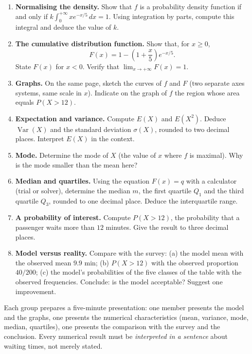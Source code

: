 \documentclass[11pt]{article}
\begin{document}
\begin{enumerate}
\item \textbf{Normalising the density.} Show that $f$ is a probability density function if and only if $\displaystyle k\int_0^{+\infty} x e^{-x/5}\,dx = 1$. Using integration by parts, compute this integral and deduce the value of $k$.
\item \textbf{The cumulative distribution function.} Show that, for $x \geq 0$,
\[
F(x) = 1 - \left(1 + \frac{x}{5}\right)e^{-x/5}.
\]
State $F(x)$ for $x<0$. Verify that $\lim_{x\to+\infty}F(x)=1$.
\item \textbf{Graphs.} On the same page, sketch the curves of $f$ and $F$ (two separate axes systems, same scale in $x$). Indicate on the graph of $f$ the region whose area equals $P(X>12)$.
\item \textbf{Expectation and variance.} Compute $E(X)$ and $E(X^2)$. Deduce $\operatorname{Var}(X)$ and the standard deviation $\sigma(X)$, rounded to two decimal places. Interpret $E(X)$ in the context.
\item \textbf{Mode.} Determine the mode of $X$ (the value of $x$ where $f$ is maximal). Why is the mode smaller than the mean here?
\item \textbf{Median and quartiles.} Using the equation $F(x)=q$ with a calculator (trial or solver), determine the median $m$, the first quartile $Q_1$ and the third quartile $Q_3$, rounded to one decimal place. Deduce the interquartile range.
\item \textbf{A probability of interest.} Compute $P(X > 12)$, the probability that a passenger waits more than $12$ minutes. Give the result to three decimal places.
\item \textbf{Model versus reality.} Compare with the survey: (a) the model mean with the observed mean $9.9$ min; (b) $P(X>12)$ with the observed proportion $40/200$; (c) the model's probabilities of the five classes of the table with the observed frequencies. Conclude: is the model acceptable? Suggest one improvement.
\end{enumerate}

\begin{methode}
Each group prepares a five-minute presentation: one member presents the model and the graphs, one presents the numerical characteristics (mean, variance, mode, median, quartiles), one presents the comparison with the survey and the conclusion. Every numerical result must be \emph{interpreted in a sentence} about waiting times, not merely stated.
\end{methode}
\end{document}

